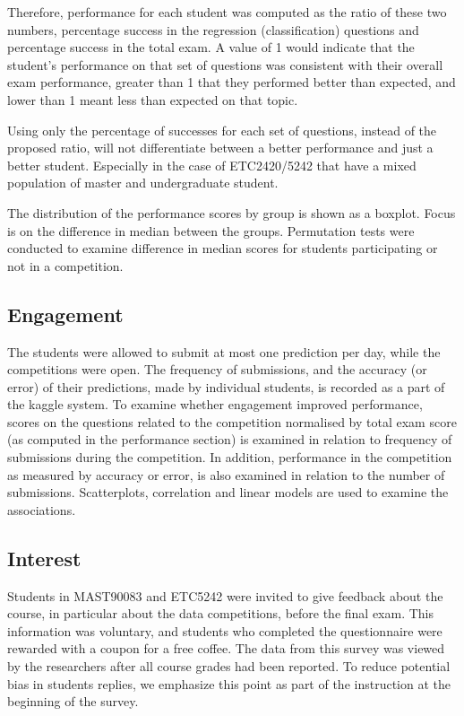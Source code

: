 \documentclass[12pt]{article}
\begin{document}
Therefore, performance for each student was computed as the ratio of
these two numbers, percentage success in the regression (classification)
questions and percentage success in the total exam. A value of 1 would
indicate that the student's performance on that set of questions was
consistent with their overall exam performance, greater than 1 that they
performed better than expected, and lower than 1 meant less than
expected on that topic.

Using only the percentage of successes for each set of questions,
instead of the proposed ratio, will not differentiate between a better
performance and just a better student. Especially in the case of
ETC2420/5242 that have a mixed population of master and undergraduate
student.

The distribution of the performance scores by group is shown as a
boxplot. Focus is on the difference in median between the groups.
Permutation tests were conducted to examine difference in median scores
for students participating or not in a competition.

\subsection{Engagement}\label{engagement}

The students were allowed to submit at most one prediction per day,
while the competitions were open. The frequency of submissions, and the
accuracy (or error) of their predictions, made by individual students,
is recorded as a part of the kaggle system. To examine whether
engagement improved performance, scores on the questions related to the
competition normalised by total exam score (as computed in the
performance section) is examined in relation to frequency of submissions
during the competition. In addition, performance in the competition as
measured by accuracy or error, is also examined in relation to the
number of submissions. Scatterplots, correlation and linear models are
used to examine the associations.

\subsection{Interest}\label{interest}

Students in MAST90083 and ETC5242 were invited to give feedback about
the course, in particular about the data competitions, before the final
exam. This information was voluntary, and students who completed the
questionnaire were rewarded with a coupon for a free coffee. The data
from this survey was viewed by the researchers after all course grades
had been reported. To reduce potential bias in students replies, we
emphasize this point as part of the instruction at the beginning of the
survey.
\end{document}
